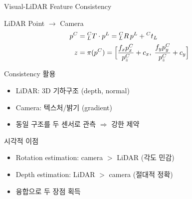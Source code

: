 \begin{frame}{Visual-LiDAR Feature Consistency}
  \begin{block}{LiDAR Point $\to$ Camera}
    \begin{align*}
      p^C &= {}^C_LT \cdot p^L
           = {}^C_LR\,p^L + {}^Ct_L \\
      z &= \pi(p^C)
        = \Bigl[\frac{f_x p^C_x}{p^C_z} + c_x,\;
                \frac{f_y p^C_y}{p^C_z} + c_y\Bigr]
    \end{align*}
  \end{block}
  \pause
  \begin{block}{Consistency 활용}
    \begin{itemize}
      \item LiDAR: 3D 기하구조 (depth, normal)
      \item Camera: 텍스처/밝기 (gradient)
      \item 동일 구조를 두 센서로 관측 $\Rightarrow$ 강한 제약
    \end{itemize}
  \end{block}
  \pause
  \begin{exampleblock}{시각적 이점}
    \begin{itemize}
      \item Rotation estimation: camera $>$ LiDAR (각도 민감)
      \item Depth estimation: LiDAR $>$ camera (절대적 정확)
      \item 융합으로 두 장점 획득
    \end{itemize}
  \end{exampleblock}
\end{frame}

